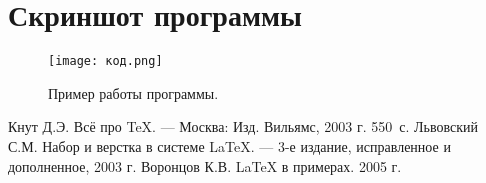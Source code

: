 \documentclass[12pt,a4paper]{scrartcl}
\begin{document}
\section{Скриншот программы}
\begin{figure}[h]
	\texttt{[image: код.png]}
	\caption{Пример работы программы.}\label{fig:par}
\end{figure}
\newpage
\begin{thebibliography}{9}
Кнут Д.Э. Всё про \TeX. \newblock --- Москва: Изд. Вильямс, 2003 г. 550~с.
Львовский С.М. Набор и верстка в системе \LaTeX{}. \newblock --- 3-е издание, исправленное и дополненное, 2003 г.
Воронцов К.В. \LaTeX{} в примерах. 2005 г.
\end{thebibliography}
\end{document}
